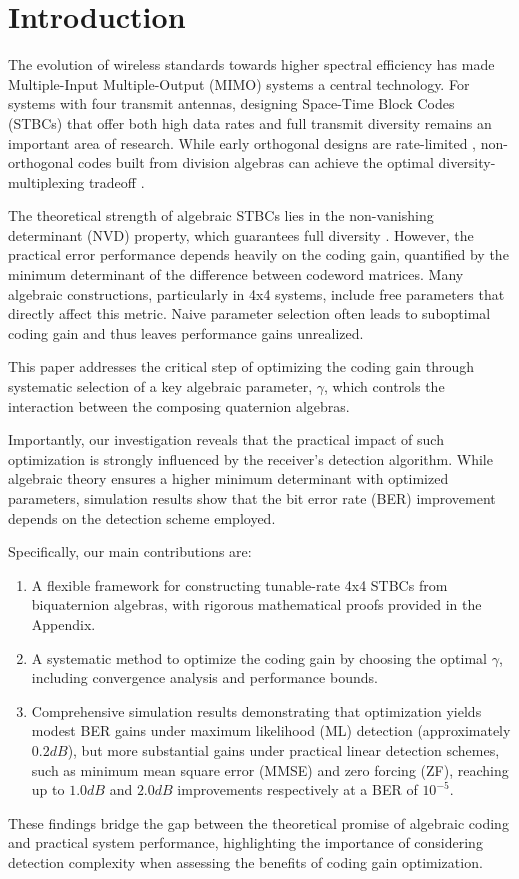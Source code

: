 \section{Introduction}
The evolution of wireless standards towards higher spectral efficiency has made Multiple-Input Multiple-Output (MIMO) systems a central technology. 
For systems with four transmit antennas, designing Space-Time Block Codes (STBCs) that offer both high data rates and full transmit diversity remains an important area of research. 
While early orthogonal designs are rate-limited \cite{1}, non-orthogonal codes built from division algebras can achieve the optimal diversity-multiplexing tradeoff \cite{2,3}.

The theoretical strength of algebraic STBCs lies in the non-vanishing determinant (NVD) property, which guarantees full diversity \cite{4}. However, the practical error performance depends heavily on the coding gain, quantified by the minimum determinant of the difference between codeword matrices. 
Many algebraic constructions, particularly in 4x4 systems, include free parameters that directly affect this metric. 
Naive parameter selection often leads to suboptimal coding gain and thus leaves performance gains unrealized.

This paper addresses the critical step of optimizing the coding gain through systematic selection of a key algebraic parameter, \(\gamma\), which controls the interaction between the composing quaternion algebras.

Importantly, our investigation reveals that the practical impact of such optimization is strongly influenced by the receiver's detection algorithm. 
While algebraic theory ensures a higher minimum determinant with optimized parameters, simulation results show that the bit error rate (BER) improvement depends on the detection scheme employed.

Specifically, our main contributions are:
\begin{enumerate}
    \item A flexible framework for constructing tunable-rate 4x4 STBCs from biquaternion algebras, with rigorous mathematical proofs provided in the Appendix.
    \item A systematic method to optimize the coding gain by choosing the optimal \(\gamma\), including convergence analysis and performance bounds.
    \item Comprehensive simulation results demonstrating that optimization yields modest BER gains under maximum likelihood (ML) detection (approximately $0.2 dB$), but more substantial gains under practical linear detection schemes, such as minimum mean square error (MMSE) and zero forcing (ZF), reaching up to $1.0 dB$ and $2.0 dB$ improvements respectively at a BER of \(10^{-5}\).
\end{enumerate}

These findings bridge the gap between the theoretical promise of algebraic coding and practical system performance, highlighting the importance of considering detection complexity when assessing the benefits of coding gain optimization.
